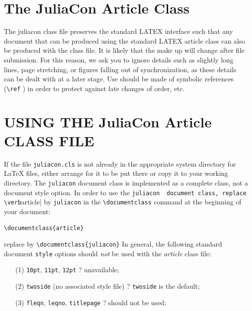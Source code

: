 \documentclass{juliacon}
\begin{document}
\section{The JuliaCon Article Class}
\label{sec:documentclass}
%
The juliacon class file preserves the standard LATEX{} interface such
that any document that can be produced using the standard LATEX{}
article class can also be produced with the class file.\vskip 6pt
It is likely that the make up will change after file submission. For
this reason, we ask you to ignore details such as slightly long lines,
page stretching, or figures falling out of synchronization, as these
details can be dealt with at a later stage.\vskip 6pt
Use should be made of symbolic references (\verb|\ref| ) in order to
protect against late changes of order, etc.

\section{USING THE JuliaCon Article CLASS FILE}

If the file \verb|juliacon.cls|  is not already in the appropriate system directory
for \LaTeX{} files, either arrange for it to be put there or copy
it to your working directory. The \verb|juliacon|  document class is implemented
as a complete class, not a document style option. In order to
use the \verb|juliacon  document class, replace \verb|article|  by \verb|juliacon|  in the
\verb|\documentclass|  command at the beginning of your document:
\vskip 6pt
\begin{centering}
    \verb|\documentclass{article}|  \end{centering}
\vskip 6pt
replace by
\vskip 6pt
 \verb|\documentclass{juliacon}|  \vskip 6pt
In general, the following standard document \verb|style|  options should
{ \itshape not} be used with the {\footnotesize \itshape article} class file:
\begin{enumerate}
\item[(1)] \verb|10pt|,  \verb|11pt|,  \verb|12pt|   ? unavailable;
\item[(2)] \verb|twoside|  (no associated style file) ? \verb|twoside|  is the default;
\item[(3)] \verb|fleqn|, \verb|leqno|, \verb|titlepage| ? should not be used;
\end{enumerate}
\end{document}
